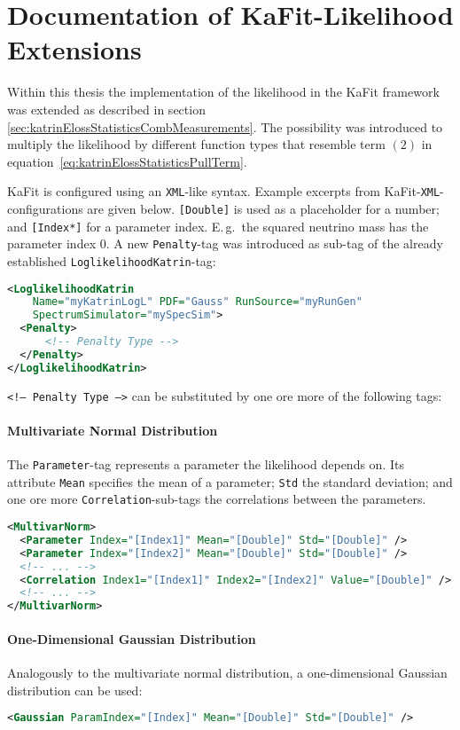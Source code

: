 \section{Documentation of KaFit-Likelihood Extensions}
\label{sec:appendixKatrinElossStatisticsLikelihoodExtKaFitConfig}
Within this thesis the implementation of the likelihood in the KaFit framework was extended as described in section \ref{sec:katrinElossStatisticsCombMeasurements}. The possibility was introduced to multiply the likelihood by different function types that resemble term $(2)$ in equation~\eqref{eq:katrinElossStatisticsPullTerm}. 

KaFit is configured using an \texttt{XML}-like syntax. Example excerpts from KaFit-\texttt{XML}-configurations are given below. {\color{brown}\texttt{[Double]}} is used as a placeholder for a number; and {\color{brown}\texttt{[Index*]}} for a parameter index. E.\,g.~the squared neutrino mass has the parameter index 0. A new \texttt{Penalty}-tag was introduced as sub-tag of the already established \texttt{LoglikelihoodKatrin}-tag:
\begin{lstlisting}[language=XML]
<LoglikelihoodKatrin 
    Name="myKatrinLogL" PDF="Gauss" RunSource="myRunGen" 
    SpectrumSimulator="mySpecSim">
  <Penalty>
      <!-- Penalty Type -->
  </Penalty>
</LoglikelihoodKatrin>
\end{lstlisting}
{\color{gray}\texttt{<!-- Penalty Type -->}} can be substituted by one ore more of the following tags:
\paragraph{Multivariate Normal Distribution}
The {\color{violet}\texttt{Parameter}}-tag represents a parameter the likelihood depends on. Its attribute {\color{magenta}\texttt{Mean}} specifies the mean of a parameter; {\color{magenta}\texttt{Std}} the standard deviation; and one ore more {\color{violet}\texttt{Correlation}}-sub-tags the correlations between the parameters.
\begin{lstlisting}[language=XML]
<MultivarNorm>
  <Parameter Index="[Index1]" Mean="[Double]" Std="[Double]" />
  <Parameter Index="[Index2]" Mean="[Double]" Std="[Double]" />
  <!-- ... -->
  <Correlation Index1="[Index1]" Index2="[Index2]" Value="[Double]" />
  <!-- ... -->
</MultivarNorm>
\end{lstlisting}

\paragraph{One-Dimensional Gaussian Distribution}
Analogously to the multivariate normal distribution, a one-dimensional Gaussian distribution can be used:
\begin{lstlisting}[language=XML]
<Gaussian ParamIndex="[Index]" Mean="[Double]" Std="[Double]" />
\end{lstlisting}

